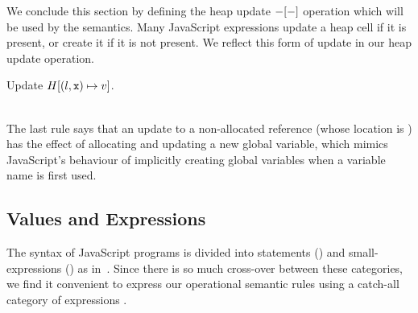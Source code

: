 \documentclass{article}
\begin{document}
%
  






%
We conclude this section by defining the heap update $-{[-]}$
operation which will be used by the semantics. Many JavaScript
expressions update a heap cell if it is present, or create it if it is
not present. We reflect this form of update in our heap update operation. 

%
\begin{display}{Update $H {[ (l,\mbox{\texttt{{\upshape x}}})\mapsto v]}$.}
%
\\[\gap]
%
\\[\gap]
%
%
%
\end{display}
%
%
The last rule says that an update to a non-allocated
reference (whose location is \nil) has the effect of allocating and
updating a new global variable,  which mimics  JavaScript's behaviour of
implicitly creating global variables when a variable name is first
used.





\subsection{Values and Expressions}\label{sec:terms}

The syntax of JavaScript programs is divided into statements () and
small-expressions () as in~\cite{MMT-APLAS-TR08}. Since there
is so much cross-over between these categories, we find it convenient
to express our operational semantic rules using a catch-all category
of expressions .
\end{document}
